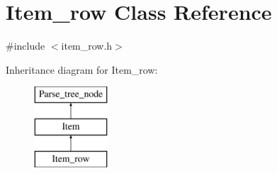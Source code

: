 \hypertarget{classItem__row}{}\section{Item\+\_\+row Class Reference}
\label{classItem__row}


{\ttfamily \#include $<$item\+\_\+row.\+h$>$}

Inheritance diagram for Item\+\_\+row\+:\begin{figure}[H]
\begin{center}
\leavevmode
\includegraphics[height=3.000000cm]{classItem__row}
\end{center}
\end{figure}
